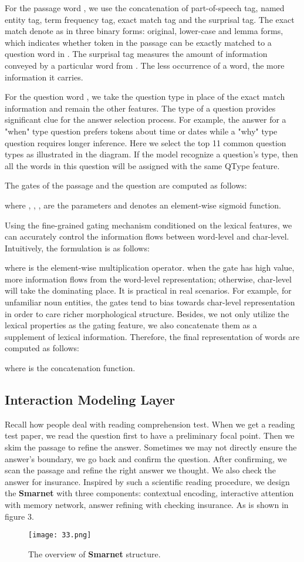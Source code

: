 \documentclass[letterpaper]{article} \usepackage{aaai18}  \usepackage{times}  \usepackage{helvet}  \usepackage{courier}  \usepackage{url}  \usepackage{graphicx}  \usepackage{booktabs}
\begin{document}
   For the passage word , we use the concatenation of part-of-speech tag, named entity tag, term frequency tag, exact match tag and the surprisal tag. The exact match denote as  in three binary forms: original, lower-case and lemma forms, which indicates whether  token  in the passage can be exactly matched to a question word in . The surprisal tag measures the amount of information conveyed by a particular word from  . The less occurrence of a word, the more information it carries. 
   
   For the question word , we take the question type in place of the exact match information and remain the other features. The type of a question provides significant clue for the answer selection process. For example, the answer for a "when" type question prefers tokens about time or dates while a "why" type question requires longer inference. Here we select the top 11 common question types as illustrated in the diagram. If the model recognize a question's type, then all the words in this question will be assigned with the same QType feature.
   
   The gates of the passage and the question are computed as follows:
   
   where , , ,  are the parameters and  denotes an element-wise sigmoid function.
   
   Using the fine-grained gating mechanism conditioned on the lexical features, we can accurately control the information flows between word-level and char-level. Intuitively, the formulation is as follows:
   
   where  is the element-wise multiplication operator. when the gate has high value, more information flows from the word-level representation; otherwise, char-level will take the dominating place. It is practical in real scenarios. For example, for unfamiliar noun entities, the gates tend to bias towards char-level representation in order to care richer morphological structure. Besides, we not only utilize the lexical properties as the gating feature, we also concatenate them as a supplement of lexical information. Therefore, the final representation of words are computed as follows:
    
   where  is the concatenation function.
 \subsection{Interaction Modeling Layer}
 Recall how people deal with reading comprehension test. When we get a reading test paper, we read the question first to have a preliminary focal point. Then we skim the passage to refine the answer. Sometimes we may not directly ensure the answer's boundary, we go back and confirm the question. After confirming, we scan the passage and refine the right answer we thought. We also check the answer for insurance. Inspired by such a scientific reading procedure, we design the \textbf{Smarnet} with three components: contextual encoding, interactive attention with memory network, answer refining with checking insurance. As is shown in figure 3.
 \begin{figure}[t]
 	\centering
 	\texttt{[image: 33.png]}
 	\caption{The overview of \textbf{Smarnet} structure.}
 \end{figure}
\end{document}

